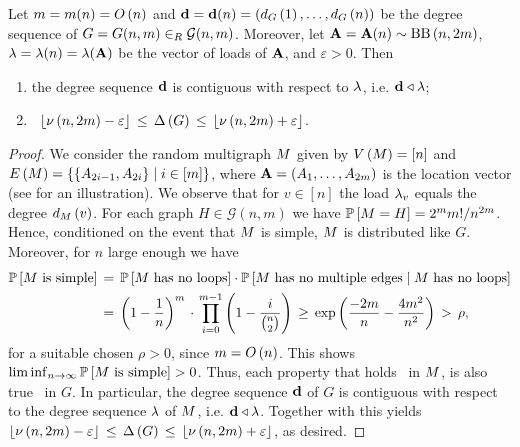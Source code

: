 \begin{thm}\label{MDthm:G_n_m_bins_balls}
	Let $m=m(n)=\bigo{n}$ and $\degreesequence=\degreesequence(n)=\left(\degree{1}{G}, \ldots, \degree{n}{G}\right)$ be the degree sequence of $G=G(n,m)\ur \mathcal G(n,m)$. Moreover, let $\location=\location(n)\sim \binsandballs{n}{2m}$, $\loadvector=\loadvector(n)=\loadvector(\location)$ be the vector of loads of $\location$, and $\varepsilon>0$. Then
	\begin{enumerate}
	\item\label{MDthm:G_n_m_bins_balls1}
	the degree sequence $\degreesequence$ is contiguous with respect to $\loadvector$, i.e.	$\contiguous{\degreesequence}{\loadvector}$;
	\item\label{MDthm:G_n_m_bins_balls2}
	\whp\ $\rounddown{\concentration{n}{2m}-\varepsilon}\lessorequal \maxdegree{G}\lessorequal \rounddown{\concentration{n}{2m}+\varepsilon}$.
	\end{enumerate}

\end{thm}
\begin{proof}
We consider the random multigraph $\multigraph$ given by $\vertexSet{\multigraph}=[n]$ and $\edgeSet{\multigraph}=\setbuilder{\left\{\locationBit_{2i-1}, \locationBit_{2i}\right\}}{i \in [m]}$, where $\location=\left(\locationBit_1, \ldots, \locationBit_{2m}\right)$ is the location vector (see  for an illustration). We observe that for $v\in[n]$ the load $\load_v$ equals the degree $\degree{v}{\multigraph}$. For each graph $H\in \mathcal{G}(n,m)$ we have $\prob{\multigraph=H}=2^mm!/n^{2m}$. Hence, conditioned on the event that $\multigraph$ is simple, $\multigraph$ is distributed like $G$. Moreover, for $n$ large enough we have \begin{align*}
	\prob{\multigraph \text{ is simple}}&\equal\prob{\multigraph \text{ has no loops}}\cdot\condprob{\multigraph \text{ has no multiple edges}}{\multigraph \text{ has no loops}}
	\\
	&\equal
	\left(1-\frac{1}{n}\right)^m\hspace{0.05cm}\cdot\hspace{0.05cm} \prod_{i=0}^{m-1}\left(1-\frac{i}{\binom{n}{2}}\right)
	\greaterorequal
	\exp\left(\frac{-2m}{n}-\frac{4m^2}{n^2}\right)\greater\rho,
\end{align*}
for a suitable chosen $\rho>0$, since $m=\bigo{n}$. This shows $\liminf_{n\to \infty}\prob{\multigraph \text{ is simple}}>0$. Thus, each property that holds \whp\ in $\multigraph$, is also true \whp\ in $G$. In particular, the degree sequence $\degreesequence$ of $G$ is contiguous with respect to the degree sequence $\loadvector$ of $\multigraph$, i.e. $\contiguous{\degreesequence}{\loadvector}$. Together with  this yields \whp\ $\rounddown{\concentration{n}{2m}-\varepsilon}\lessorequal \maxdegree{G}\lessorequal \rounddown{\concentration{n}{2m}+\varepsilon}$, as desired.
\end{proof}

